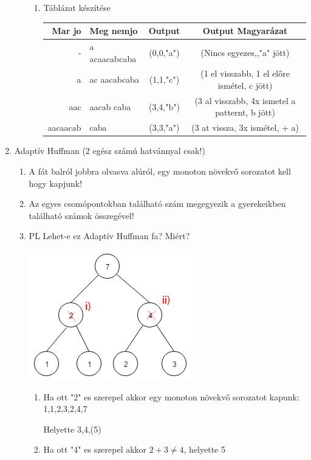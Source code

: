 \begin{enumerate}
\begin{itemize}
				\begin{enumerate}
					\item Táblázat készítése

					\begin{tabular}{|r|l|c|c|}
 					 \hline
 					 Mar jo & Meg nemjo & Output & Output Magyarázat \\ \hline \hline
 					 - & a acaacabcaba & (0,0,"a") & (Nincs egyezes,,"a" jött) \\ \hline
 					 a & ac aacabcaba & (1,1,"c") & (1 el visszabb, 1 el előre ismétel, c jött) \\ \hline
					aac & aacab caba & (3,4,"b") & (3 al visszabb, 4x ismetel a patternt, b jött) \\ \hline
					aacaacab & caba &  (3,3,"a") & (3 at vissza, 3x ismétel, + a)\\ \hline
					\end{tabular}
				\end{enumerate}
		\end{itemize}

	\item Adaptív Huffman (2 egész számú hatvánnyal csak!)

		\begin{enumerate}
			\item A fát balról jobbra olvasva alúról, egy monoton növekvő sorozatot kell hogy kapjunk!
			\item Az egyes csomópontokban található szám megegyezik a gyerekeikben található számok összegével!

			\item PL Lehet-e ez Adaptív Huffman fa? Miért?
					\begin{center}
						\includegraphics[scale=0.7]{img/AdaptivHuffman}
					\end{center}
				\begin{enumerate}
					\item Ha ott "2" es szerepel akkor egy monoton növekvő sorozatot kapunk: 1,1,2,3,2,4,7

							Helyette 3,4,(5)
					\item Ha ott "4" es szerepel akkor $2+3 \neq 4$, helyette 5
				\end{enumerate}
		\end{enumerate}


\end{enumerate}

